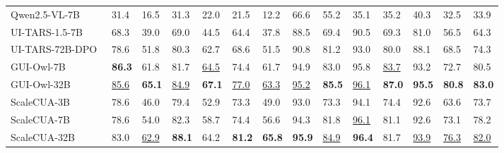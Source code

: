 \begin{table}[!b]
{\begin{tabular}{llllllllllllll}
    Qwen2.5-VL-7B~\citeyearpar{bai2025qwen25vl} &  31.4  &  16.5  & 31.3 & 22.0 & 21.5 & 12.2 & 66.6 & 55.2 & 35.1 & 35.2 & 40.3 & 32.5 & 33.9 \\
    UI-TARS-1.5-7B~\citeyearpar{qin2025uitars} &  68.3 &  39.0  & 69.0 & 44.5 & {64.4} & 37.8 & 88.5 & 69.4 & 90.5 & 69.3 & 81.0 & 56.5  & 64.3 \\
    UI-TARS-72B-DPO~\citeyearpar{qin2025uitars} &  {78.6}  & {51.8}  & {80.3} & {62.7} & {68.6} &{51.5} & 90.8 &{81.2}& {93.0} & {80.0} & 88.1& {68.5} & {74.3} \\
    GUI-Owl-7B~\citeyearpar{ye2025mobile}  & \textbf{86.3} & 61.8 & 81.7 & \underline{64.5} & 74.4 & {61.7} & 94.9 & 83.0 & 95.8  &  \underline{83.7} & 93.2  & 72.7  &  80.5 \\
    GUI-Owl-32B~\citeyearpar{ye2025mobile}  & \underline{85.6} & \textbf{65.1} & \underline{84.9} & \textbf{67.1} & \underline{77.0} & \underline{63.3} & \underline{95.2} & \textbf{85.5} & \underline{96.1}  & \textbf{87.0}  & \textbf{95.5}  & \textbf{80.8}  & \textbf{83.0}  \\
    \hline
    ScaleCUA-3B &  78.6  & 46.0 & 79.4 & 52.9 & 73.3 & 49.0 & 93.0 & 73.3 &94.1  & 74.4 & 92.6 & 63.6 & 73.7 \\
    ScaleCUA-7B &  78.6  & 54.0 & 82.3 & 58.7 & 74.4 & 56.6 & 94.3 & 81.8 &\underline{96.1}  & 81.1 & 92.6 & 73.1 & 78.2 \\
    ScaleCUA-32B &  83.0  & \underline{62.9} & \textbf{88.1} & 64.2 & \textbf{81.2} & \textbf{65.8} & \textbf{95.9} & \underline{84.9} & \textbf{96.4}  & {81.7} & \underline{93.9} & \underline{76.3} & \underline{82.0} \\
    \bottomrule
  \end{tabular}
  }
  \vspace{-3mm}
  \label{tab:mmbenchgui-l2}
\end{table}